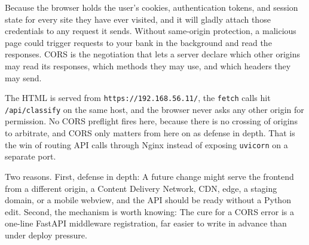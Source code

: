 Because the browser holds the user's cookies, authentication tokens, and
session state for every site they have ever visited, and it will gladly
attach those credentials to any request it sends.
Without same-origin protection, a malicious page could trigger requests
to your bank in the background and read the responses.
CORS is the negotiation that lets a server declare which other origins
may read its responses, which methods they may use, and which headers
they may send.


The HTML is served from \texttt{https://192.168.56.11/}, the
\texttt{fetch} calls hit \texttt{/api/classify} on the same host, and
the browser never asks any other origin for permission.
No CORS preflight fires here, because there is no crossing of origins to
arbitrate, and CORS only matters from here on as defense in depth.
That is the win of routing API calls through Nginx instead of exposing
\texttt{uvicorn} on a separate port.

Two reasons.
First, defense in depth: A future change might serve the frontend from a
different origin, a Content Delivery Network, CDN, edge, a staging
domain, or a mobile webview, and the API should be ready without a Python
edit.
Second, the mechanism is worth knowing: The cure for a CORS error is a
one-line FastAPI middleware registration, far easier to write in advance
than under deploy pressure.

\fi
\iffalse
\newpage
